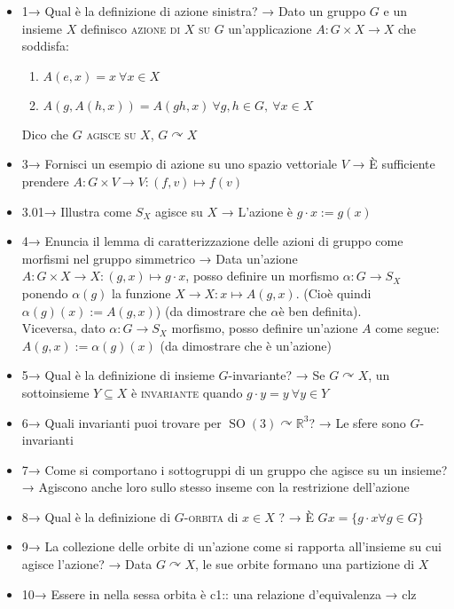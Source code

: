 \documentclass[A4,12pt]{article}
\newcommand{\R}{\mathbb{R}}
\newcommand{\acts}{\curvearrowright}
\begin{document}
	
	\begin{itemize}[noitemsep]
		\item 1→ Qual è la definizione di azione sinistra? → Dato un gruppo $ G $ e un insieme $ X $ definisco \textsc{azione di $X$ su $ G $ } un'applicazione $ A:G\times X\to X $ che soddisfa: \begin{enumerate}[noitemsep]
			\item $ A(e,x) = x\ \forall x \in X $
			\item $ A(g,A(h,x)) = A(gh,x)\ \forall g,h\in G,\ \forall x\in X$
		\end{enumerate} 
		Dico che $ G $ \textsc{agisce su} $ X $, $ G\acts X$
		\item 3→  Fornisci un esempio di azione su uno spazio vettoriale $V$ → È sufficiente prendere $A:G\times V\to V: (f,v)\mapsto f(v)$
		\item 3.01→  Illustra come $S_X$ agisce su $X$ → L'azione è $ g\cdot x := g(x) $ 
		\item 4→ Enuncia il lemma di caratterizzazione delle azioni di gruppo come morfismi nel gruppo simmetrico → Data un'azione $ A:G\times X \to X:(g,x)\mapsto g\cdot x $, posso definire un morfismo $ \alpha: G\to S_X $ ponendo $ \alpha(g) $ la funzione $X\to X: x\mapsto A(g,x) $. (Cioè quindi $ \alpha(g)(x):=A(g,x) $) (da dimostrare che $ \alpha $è ben definita).\\ Viceversa, dato $ \alpha:G\to S_X $ morfismo, posso definire un'azione $ A $ come segue: $ A(g,x) := \alpha(g)(x) $ (da dimostrare che è un'azione)
		\item 5→  Qual è la definizione di insieme $G$-invariante? →  Se $G\acts X$, un sottoinsieme $Y\subseteq X$ è \textsc{invariante} quando $g\cdot y = y\ \forall y \in Y $ 
		\item 6→ Quali invarianti puoi trovare per $ \operatorname{SO}(3)\acts \R^3 $? → Le sfere sono $ G $-invarianti 
		\item 7→ Come si comportano i sottogruppi di un gruppo che agisce su un insieme? → Agiscono anche loro sullo stesso inseme con la restrizione dell'azione
		\item 8→ Qual è la definizione di $ G $\textsc{-orbita} di $ x\in X $ ? → È $ Gx = \{g\cdot x \forall g \in G\} $
		\item 9→ La collezione delle orbite di un'azione come si rapporta all'insieme su cui agisce l'azione? → Data $ G\acts X $, le sue orbite formano una partizione di $ X $ 
		\item 10→ Essere in nella sessa orbita è {{c1:: una relazione d'equivalenza}} → clz 

\end{itemize}
\end{document}
